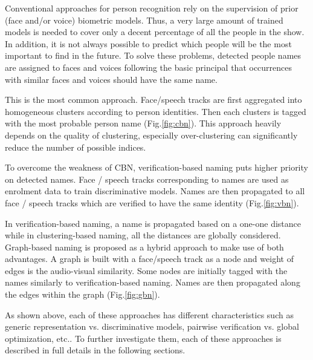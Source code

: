 Conventional approaches for person recognition rely on the supervision of prior (face and/or voice) biometric models. Thus, a very large amount of trained models is needed to cover only a decent percentage of all the people in the show.
%
In addition, it is not always possible to predict which people will be the most important to find in the future.
%
To solve these problems, detected people names are assigned to faces and voices following the basic principal that occurrences with similar faces and voices should have the same name.
%

 This is the most common approach. Face/speech tracks are first aggregated into homogeneous clusters according to person identities. Then each clusters is tagged with the most probable person name (Fig.\ref{fig:cbn}). This approach heavily depends on the quality of clustering, especially over-clustering can significantly reduce the number of possible indices.

 To overcome the weakness of CBN, verification-based naming puts higher priority on detected names. Face / speech tracks corresponding to names are used as enrolment data to train discriminative models. Names are then propagated to all face / speech tracks which are verified to have the same identity (Fig.\ref{fig:vbn}).

 In verification-based naming, a name is propagated based on a one-one distance while in clustering-based naming, all the distances are globally considered. Graph-based naming is proposed as a hybrid approach to make use of both advantages.
A graph is built with a face/speech track as a node and weight of edges is the audio-visual similarity. Some nodes are initially tagged with the names similarly to verification-based naming. Names are then propagated along the edges within the graph (Fig.\ref{fig:gbn}).

As shown above, each of these approaches has different characteristics such as generic representation vs. discriminative models, pairwise verification vs. global optimization, etc..
%
To further investigate them, each of these approaches is described in full details in the following sections. 

\endinput